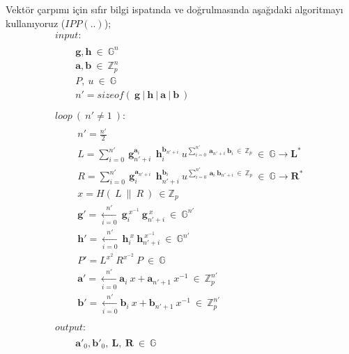 \documentclass[a4paper,11pt]{article}
\begin{document}
Vektör çarpımı için sıfır bilgi ispatında ve doğrulmasında aşağıdaki algoritmayı kullanıyoruz ($IPP(..)$);
$$
\begin{array}{l}
{\textstyle input:}\\
{\textstyle \begin{aligned}
\ \ \ \  & \boldsymbol{g} ,\boldsymbol{h} \ \in \ \mathbb{G}^{n}\\
 & \boldsymbol{a} ,\boldsymbol{b} \ \in \ \mathbb{Z}^{n}_{p}\\
 & P,\ u\ \in \ \mathbb{G}\\
 & n'=sizeof( \ \boldsymbol{g} \ |\ \boldsymbol{h} \ |\ \boldsymbol{a} \ |\ \boldsymbol{b} \ )
\end{aligned}}\\
\\
{\textstyle loop\ ( \ n'\neq 1\ ) :}\\
{\textstyle \begin{aligned}
\ \ \ \ \  & n'=\frac{n'}{2}\\
 & {\displaystyle L=\sum ^{n'}_{i=0} \ \boldsymbol{g}^{\boldsymbol{a}_{i}}_{n'+i} \ \ \boldsymbol{h}^{\boldsymbol{b}_{n'+i}}_{i} \ u^{\sum ^{n'}_{i=0} \ \boldsymbol{a}_{n'+i} \ \boldsymbol{b}_{i} \ \in \ \mathbb{Z}_{p}} \ \in \ \mathbb{G}\rightarrow \boldsymbol{L}^{*}}\\
 & R=\sum ^{n'}_{i=0} \ \boldsymbol{g}^{\boldsymbol{a}_{n'+i}}_{i} \ \ \boldsymbol{h}^{\boldsymbol{b}_{i}}_{n'+i} \ u^{\sum ^{n'}_{i=0} \ \boldsymbol{a}_{i} \ \boldsymbol{b}_{n'+i} \ \in \ \mathbb{Z}_{p}} \ \in \ \mathbb{G}\rightarrow \boldsymbol{R}^{*}\\
 & x=H( \ L\ \| \ R\ ) \ \in \mathbb{Z}_{p}\\
 & \boldsymbol{g} '=\xleftarrow[i=0]{n'} \ \boldsymbol{g}^{\ x^{-1}}_{i} \ \boldsymbol{g}^{\ x}_{n'+i} \ \in \ \mathbb{G}^{n'}\\
 & \boldsymbol{h} '=\xleftarrow[i=0]{n'} \ \boldsymbol{h}^{\ x}_{i} \ \boldsymbol{h}^{\ x^{-1}}_{n'+i} \ \in \ \mathbb{G}^{n'}\\
 & P'=L^{x^{2}} \ R^{x^{-2}} \ P\ \in \ \mathbb{G}\\
 & \boldsymbol{a} '=\xleftarrow[i=0]{n'}\boldsymbol{a}_{i} \ x+\boldsymbol{a}_{n'+1} \ x^{-1} \ \in \ \mathbb{Z}^{n'}_{p}\\
 & \boldsymbol{b} '=\xleftarrow[i=0]{n'}\boldsymbol{b}_{i} \ x+\boldsymbol{b}_{n'+1} \ x^{-1} \ \in \ \mathbb{Z}^{n'}_{p}
\end{aligned}}\\
\\
{\textstyle output:}\\
{\textstyle \begin{aligned}
\ \ \ \  & \boldsymbol{a} '_{0} ,\boldsymbol{b} '_{0} ,\ \boldsymbol{L} ,\ \boldsymbol{R} \ \in \ \mathbb{G}
\end{aligned}}
\end{array}
$$
\end{document}
